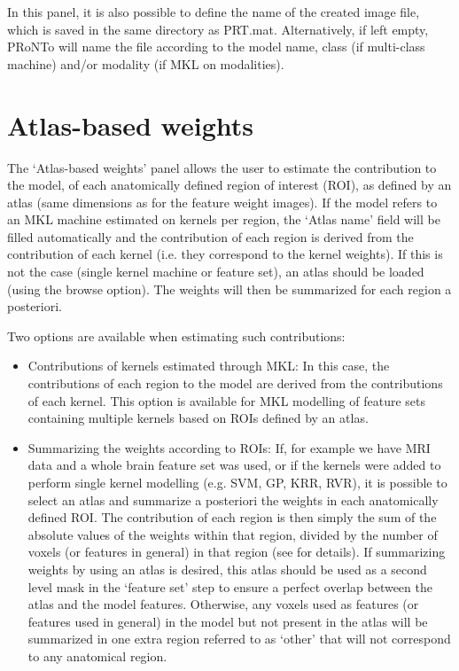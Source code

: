 In this panel, it is also possible to define the name of the created image file, which is saved in the same directory as PRT.mat. Alternatively, if left empty, PRoNTo will name the file according to the model name, class (if multi-class machine) and/or modality (if MKL on modalities).
\\[1.5cm]

\section{Atlas-based weights}

The `Atlas-based weights' panel allows the user to estimate the contribution to the model, of each anatomically defined region of interest (ROI), as defined by an atlas (same dimensions as for the feature weight images). If the model refers to an MKL machine estimated on kernels per region, the `Atlas name' field will be filled automatically and the contribution of each region is derived from the contribution of each kernel (i.e. they correspond to the kernel weights). If this is not the case (single kernel machine or feature set), an atlas should be loaded (using the browse option). The weights will then be summarized for each region a posteriori. 

Two options are available when estimating such contributions:

\begin{itemize}
\item Contributions of kernels estimated through MKL: In this case, the contributions of each region to the model are derived from the contributions of each kernel. This option is available for MKL modelling of feature sets containing multiple kernels based on ROIs defined by an atlas.

\item Summarizing the weights according to ROIs: If, for example we have MRI data and a whole brain feature set was used, or if the kernels were added to perform single kernel modelling (e.g. SVM, GP, KRR, RVR), it is possible to select an atlas and summarize a posteriori the weights in each anatomically defined ROI. The contribution of each region is then simply the sum of the absolute values of the weights within that region, divided by the number of voxels (or features in general) in that region (see \cite{Schrouff2013a} for details). If summarizing weights by using an atlas is desired, this atlas should be used as a second level mask in the `feature set' step to ensure a perfect overlap between the atlas and the model features. Otherwise, any voxels used as features (or features used in general) in the model but not present in the atlas will be summarized in one extra region referred to as `other' that will not correspond to any anatomical region.
\end{itemize}

